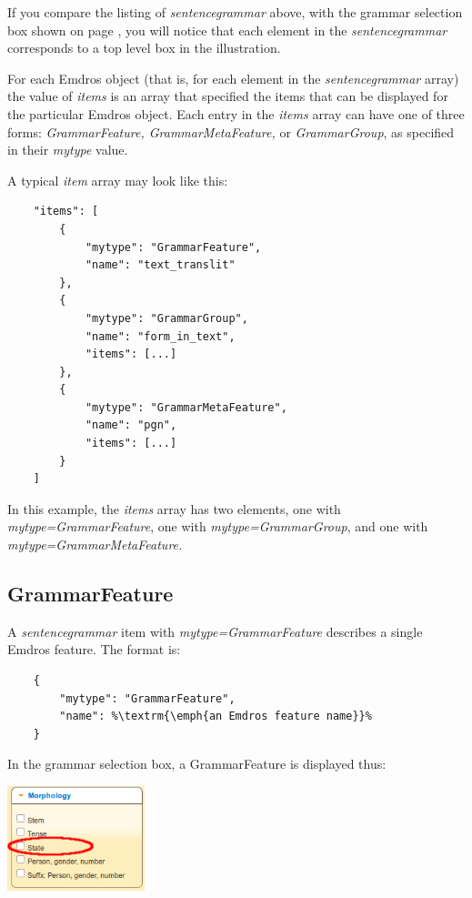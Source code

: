 \documentclass[11pt,oneside,a4paper]{memoir}
\begin{document}
If you compare the listing of \emph{sentencegrammar} above, with the grammar selection box shown on
page \pageref{grammarselect}, you will notice that each element in the \emph{sentencegrammar}
corresponds to a top level box in the illustration.

For each Emdros object (that is, for each element in the \emph{sentencegrammar} array) the value of
\emph{items} is an array that specified the items that can be displayed for the particular Emdros
object. Each entry in the \emph{items} array can have one of three forms: \emph{GrammarFeature,
  GrammarMetaFeature,} or \emph{GrammarGroup}, as specified in their \emph{mytype} value.

A typical \emph{item} array may look like this:

\begin{lstlisting}
    "items": [
        {
            "mytype": "GrammarFeature",
            "name": "text_translit"
        },
        {
            "mytype": "GrammarGroup",
            "name": "form_in_text",
            "items": [...]
        },
        {
            "mytype": "GrammarMetaFeature",
            "name": "pgn",
            "items": [...]
        }
    ]
\end{lstlisting}

In this example, the \emph{items} array has two elements, one with \emph{mytype=GrammarFeature},
one with \emph{mytype=GrammarGroup}, and one with \emph{mytype=GrammarMetaFeature.}

\subsection{GrammarFeature}\label{gf}

A \emph{sentencegrammar} item with \emph{mytype=GrammarFeature} describes a single Emdros
feature. The format is:

\begin{lstlisting}
    {
        "mytype": "GrammarFeature",
        "name": %\textrm{\emph{an Emdros feature name}}%
    }
\end{lstlisting}

\Needspace*{5cm}%
In the grammar selection box, a GrammarFeature is displayed thus:

\begin{center}
  \includegraphics[width=0.3\textwidth]{state1.png}
\end{center}
\end{document}
